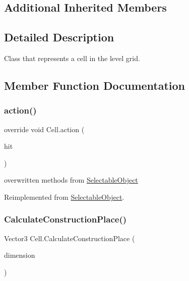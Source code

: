 \subsection*{Additional Inherited Members}


\subsection{Detailed Description}
Class that represents a cell in the level grid. 



\subsection{Member Function Documentation}
\mbox{\label{class_cell_aecb362e44d7117cb4ecb1961092bcb28}} 
\subsubsection{\texorpdfstring{action()}{action()}}
{\footnotesize\ttfamily override void Cell.\+action (\begin{DoxyParamCaption}\item[{Raycast\+Hit}]{hit }\end{DoxyParamCaption})\hspace{0.3cm}{\ttfamily [virtual]}}



overwritten methods from \mbox{\hyperlink{class_selectable_object}{Selectable\+Object}} 



Reimplemented from \mbox{\hyperlink{class_selectable_object_adb08e08703832f624d9bf62fc02208a8}{Selectable\+Object}}.

\mbox{\label{class_cell_a924b6308bc7956563759d9bd2605850e}} 
\subsubsection{\texorpdfstring{Calculate\+Construction\+Place()}{CalculateConstructionPlace()}}
{\footnotesize\ttfamily Vector3 Cell.\+Calculate\+Construction\+Place (\begin{DoxyParamCaption}\item[{Vector2\+Int}]{dimension }\end{DoxyParamCaption})}



